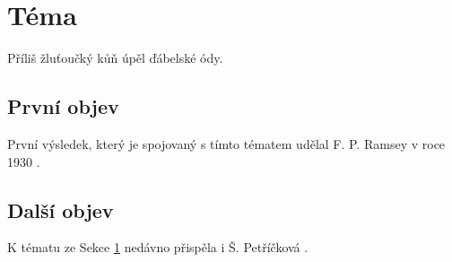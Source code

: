 \documentclass{article}
\begin{document}
\section{Téma}
\label{sec:theme}
Příliš žluťoučký kůň úpěl ďábelské ódy.

\subsection{První objev}
První výsledek, který je spojovaný s tímto tématem udělal F. P. Ramsey v roce 1930 \cite{Ramsey1930FormalLogic}.

\subsection{Další objev}
K tématu ze Sekce \ref{sec:theme} nedávno přispěla i Š. Petříčková \cite{Petrckov2014OnlineRT}.



\end{document}
